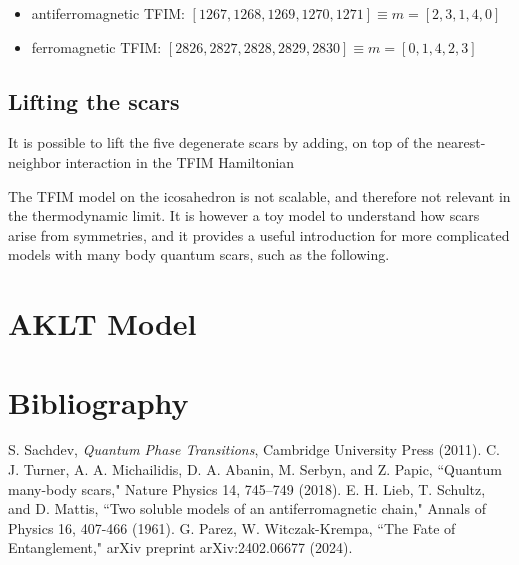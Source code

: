 \documentclass{article}
\begin{document}
\begin{itemize}

\item antiferromagnetic TFIM: $[1267,1268,1269,1270,1271] \equiv m = [2, 3, 1, 4, 0]$

\item ferromagnetic TFIM: $[2826,2827,2828,2829, 2830] \equiv m = [ 0, 1, 4, 2, 3]$

\end{itemize}

\subsection{Lifting the scars}

It is possible to  lift the five degenerate scars by adding, on top of the nearest-neighbor interaction in the TFIM Hamiltonian


The TFIM model on the icosahedron is not scalable, and therefore not relevant in the thermodynamic limit. It is however a toy model to understand how scars arise from symmetries, and it provides a useful introduction for more complicated models with many body quantum scars, such as the following.

\section{AKLT Model}


\section*{Bibliography}
\begin{thebibliography}{9}
     S. Sachdev, \textit{Quantum Phase Transitions}, Cambridge University Press (2011).
     C. J. Turner, A. A. Michailidis, D. A. Abanin, M. Serbyn, and Z. Papic, ``Quantum many-body scars," Nature Physics 14, 745–749 (2018).
     E. H. Lieb, T. Schultz, and D. Mattis, ``Two soluble models of an antiferromagnetic chain," Annals of Physics 16, 407-466 (1961).
     G. Parez, W. Witczak-Krempa, ``The Fate of Entanglement," arXiv preprint arXiv:2402.06677 (2024).
\end{thebibliography}
\end{document}
